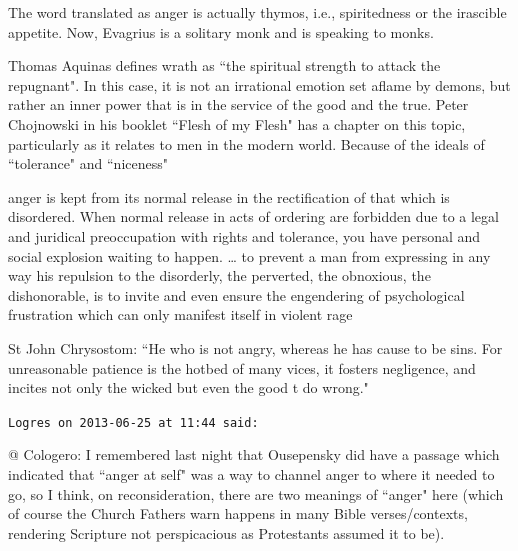 \begin{footnotesize}
\begin{sffamily}
\begin{quotex}
\end{quotex}
The word translated as anger is actually thymos, i.e., spiritedness or the irascible appetite. Now, Evagrius is a solitary monk and is speaking to monks.

Thomas Aquinas defines wrath as ``the spiritual strength to attack the repugnant". In this case, it is not an irrational emotion set aflame by demons, but rather an inner power that is in the service of the good and the true. Peter Chojnowski in his booklet ``Flesh of my Flesh" has a chapter on this topic, particularly as it relates to men in the modern world. Because of the ideals of ``tolerance" and ``niceness" 

\begin{quotex}
anger is kept from its normal release in the rectification of that which is disordered. When normal release in acts of ordering are forbidden due to a legal and juridical preoccupation with rights and tolerance, you have personal and social explosion waiting to happen. … to prevent a man from expressing in any way his repulsion to the disorderly, the perverted, the obnoxious, the dishonorable, is to invite and even ensure the engendering of psychological frustration which can only manifest itself in violent rage 

\end{quotex}
St John Chrysostom: ``He who is not angry, whereas he has cause to be sins. For unreasonable patience is the hotbed of many vices, it fosters negligence, and incites not only the wicked but even the good t do wrong."


\hfill

\texttt{Logres on 2013-06-25 at 11:44 said: }

@ Cologero: I remembered last night that Ousepensky did have a passage which indicated that ``anger at self" was a way to channel anger to where it needed to go, so I think, on reconsideration, there are two meanings of ``anger" here (which of course the Church Fathers warn happens in many Bible verses/contexts, rendering Scripture not perspicacious as Protestants assumed it to be).

\hfill

\end{sffamily}\end{footnotesize}
